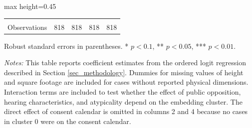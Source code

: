 \begin{table}[H]
\begin{adjustbox}{max height=0.45\textheight}
\begin{threeparttable}
\begin{tabular}{lcccc}
 & & & & \\ 
Observations  & 818 & 818 & 818 & 818 \\ [1.8ex]
\bottomrule
\end{tabular}
\begin{tablenotes}[flushleft]
\footnotesize
\item Robust standard errors in parentheses. * $p<0.1$, ** $p<0.05$, *** $p<0.01$.
\item \textit{Notes:} This table reports coefficient estimates from the ordered logit regression described in Section \ref{sec_methodology}. Dummies for missing values of height and square footage are included for cases without reported physical dimensions. Interaction terms are included to test whether the effect of public opposition, hearing characteristics, and atypicality depend on the embedding cluster. The direct effect of consent calendar is omitted in columns 2 and 4 because no cases in cluster 0 were on the consent calendar.
\end{tablenotes}
\end{threeparttable}
\end{adjustbox}
\end{table}
